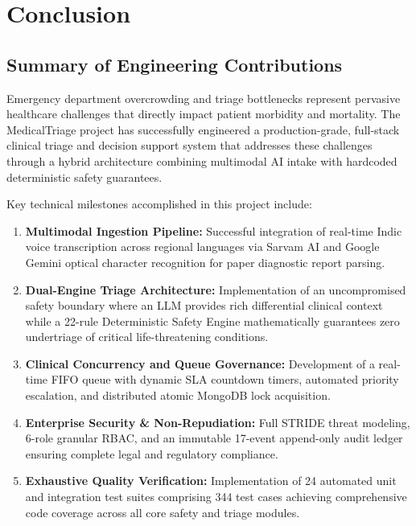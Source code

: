 \documentclass[11pt,a4paper,oneside]{report}
\begin{document}
\chapter{Conclusion}

\section{Summary of Engineering Contributions}
Emergency department overcrowding and triage bottlenecks represent pervasive healthcare challenges that directly impact patient morbidity and mortality. The MedicalTriage project has successfully engineered a production-grade, full-stack clinical triage and decision support system that addresses these challenges through a hybrid architecture combining multimodal AI intake with hardcoded deterministic safety guarantees.

Key technical milestones accomplished in this project include:
\begin{enumerate}[leftmargin=20pt]
  \item \textbf{Multimodal Ingestion Pipeline:} Successful integration of real-time Indic voice transcription across regional languages via Sarvam AI and Google Gemini optical character recognition for paper diagnostic report parsing.
  \item \textbf{Dual-Engine Triage Architecture:} Implementation of an uncompromised safety boundary where an LLM provides rich differential clinical context while a 22-rule Deterministic Safety Engine mathematically guarantees zero undertriage of critical life-threatening conditions.
  \item \textbf{Clinical Concurrency and Queue Governance:} Development of a real-time FIFO queue with dynamic SLA countdown timers, automated priority escalation, and distributed atomic MongoDB lock acquisition.
  \item \textbf{Enterprise Security \& Non-Repudiation:} Full STRIDE threat modeling, 6-role granular RBAC, and an immutable 17-event append-only audit ledger ensuring complete legal and regulatory compliance.
  \item \textbf{Exhaustive Quality Verification:} Implementation of 24 automated unit and integration test suites comprising 344 test cases achieving comprehensive code coverage across all core safety and triage modules.
\end{enumerate}
\end{document}
